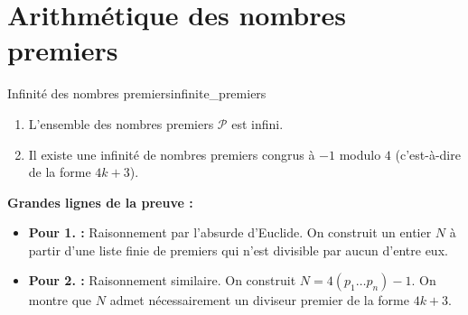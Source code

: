 \documentclass{prepacours}
\begin{document}

\pagedegarde

\section{Arithmétique des nombres premiers}

\begin{proposition}{Infinité des nombres premiers}{infinite_premiers}
    \begin{enumerate}
        \item L'ensemble des nombres premiers $\mathcal{P}$ est infini.
        \item Il existe une infinité de nombres premiers congrus à $-1$ modulo $4$ (c'est-à-dire de la forme $4k+3$).
    \end{enumerate}
\end{proposition}

\noindent \textbf{Grandes lignes de la preuve :}
\begin{itemize}
    \item \textbf{Pour 1. :} Raisonnement par l'absurde d'Euclide. On construit un entier $N$ à partir d'une liste finie de premiers qui n'est divisible par aucun d'entre eux.
    \item \textbf{Pour 2. :} Raisonnement similaire. On construit $N = 4(p_1 \dots p_n) - 1$. On montre que $N$ admet nécessairement un diviseur premier de la forme $4k+3$.
\end{itemize}
\end{document}
